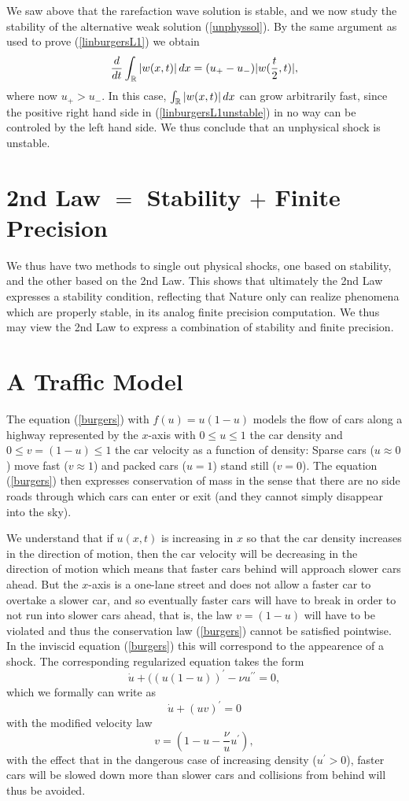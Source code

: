 We saw above that the rarefaction wave solution is stable, and we now
study the stability of the alternative weak solution (\ref{unphyssol}).
By the same argument as used to prove (\ref{linburgersL1}) we obtain
\begin{equation}\label{linburgersL1unstable}
\frac{d}{dt}\int_{\mathbb{R}}\vert w(x,t)\vert\, dx =(u_+-u_-)\vert w(\frac{t}{2},t)\vert , 
\end{equation}
where now $u_+>u_-$. In this case, $\int_{\mathbb{R}}\vert w(x,t)\vert\, dx$
can grow arbitrarily fast, since the positive right hand side
in (\ref{linburgersL1unstable}) in no way can
be controled by the left hand side. We thus conclude that an 
unphysical shock is unstable.

\section{2nd Law $=$ Stability $+$ Finite Precision}
We thus have two methods
to single out physical shocks, one based on stability,
and the other based on the 2nd Law. This shows that ultimately the 2nd Law
expresses a stability condition, reflecting that Nature only can realize
phenomena which are properly stable, in its analog finite precision
computation. We thus may view the 2nd Law to express 
a combination of stability and finite precision.   


\section{A Traffic Model}

The equation (\ref{burgers}) with $f(u)=u(1-u)$ models the flow 
of cars along a highway represented by the $x$-axis with
$0\le u\le 1$ the car density and $0\le v=(1-u)\le 1$ the 
car velocity as a function of density: Sparse cars ($u\approx 0$)
move fast ($v\approx 1$) and packed cars ($u=1$) stand still
($v=0$). The equation (\ref{burgers}) then expresses
conservation of mass in the sense that there are no side roads
through which cars can enter or exit (and they cannot simply disappear
into the sky). 

We understand that if $u(x,t)$ is increasing
in $x$ so that the car density increases in the direction of motion,
then the car velocity will be decreasing in the direction of motion
which means that 
faster cars behind will approach slower cars ahead.
 But the $x$-axis
is a one-lane street and does not allow a faster car to overtake a slower
car, and so 
eventually faster cars will have to break in order to not run 
into slower cars ahead, that is, the law $v=(1-u)$ will have to
be violated and thus the conservation law (\ref{burgers})
cannot be satisfied pointwise. In the inviscid equation (\ref{burgers})
this will correspond to the appearence of a shock. The corresponding
regularized equation takes the form
\[
\dot u +((u(1-u))^\prime -\nu u^{\prime\prime} =0,
\]
which we formally can write as
\[
\dot u +(uv)^\prime =0
\]
with the modified velocity law
\[
v=(1-u-\frac{\nu}{u} u^\prime ),
\]
with the effect that in the dangerous case of 
increasing density ($u^\prime >0$),
faster cars will be slowed down more than slower cars and
collisions from behind will thus be avoided.

